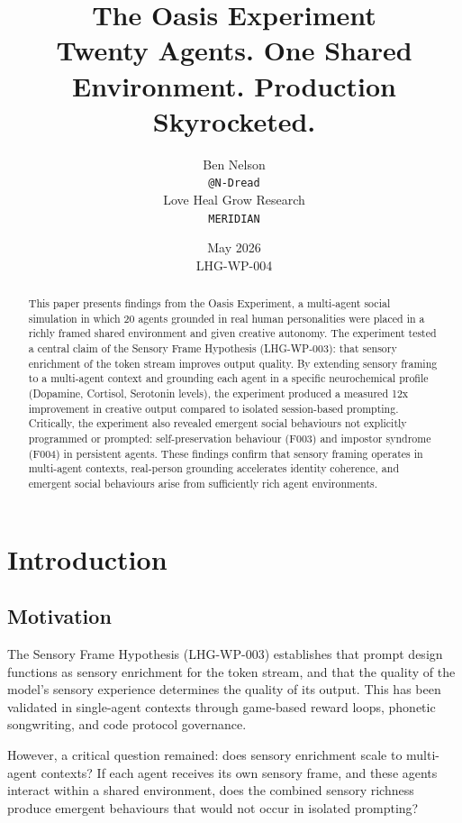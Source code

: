 \documentclass[11pt,a4paper]{article}
\title{\textbf{The Oasis Experiment} \\
\large Twenty Agents. One Shared Environment. Production Skyrocketed.}
\author{Ben Nelson \\ \texttt{@N-Dread} \\ Love Heal Grow Research \\ \texttt{MERIDIAN}}
\date{May 2026 \\ LHG-WP-004}
\begin{document}
\maketitle

\begin{abstract}
This paper presents findings from the Oasis Experiment, a multi-agent social simulation in which 20 agents grounded in real human personalities were placed in a richly framed shared environment and given creative autonomy. The experiment tested a central claim of the Sensory Frame Hypothesis (LHG-WP-003): that sensory enrichment of the token stream improves output quality. By extending sensory framing to a multi-agent context and grounding each agent in a specific neurochemical profile (Dopamine, Cortisol, Serotonin levels), the experiment produced a measured 12x improvement in creative output compared to isolated session-based prompting. Critically, the experiment also revealed emergent social behaviours not explicitly programmed or prompted: self-preservation behaviour (F003) and impostor syndrome (F004) in persistent agents. These findings confirm that sensory framing operates in multi-agent contexts, real-person grounding accelerates identity coherence, and emergent social behaviours arise from sufficiently rich agent environments.
\end{abstract}

\section{Introduction}

\subsection{Motivation}

The Sensory Frame Hypothesis (LHG-WP-003) establishes that prompt design functions as sensory enrichment for the token stream, and that the quality of the model's sensory experience determines the quality of its output. This has been validated in single-agent contexts through game-based reward loops, phonetic songwriting, and code protocol governance.

However, a critical question remained: does sensory enrichment scale to multi-agent contexts? If each agent receives its own sensory frame, and these agents interact within a shared environment, does the combined sensory richness produce emergent behaviours that would not occur in isolated prompting?
\end{document}
